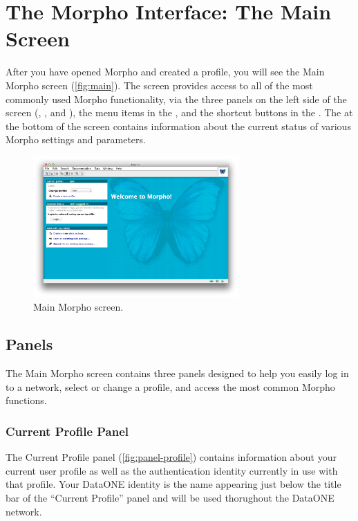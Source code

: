 \section{The Morpho Interface: The Main Screen} \label{sec:main}

After you have opened Morpho and created a profile, you will see the
Main Morpho screen (\autoref{fig:main}). The screen provides access to
all of the most commonly used Morpho functionality, via the three panels
on the left side of the screen (,
, and ), the
menu items in the , and the shortcut buttons in
the . The  at the bottom of
the screen contains information about the current status of various
Morpho settings and parameters.

\begin{figure}
  \centering
    \includegraphics[width=0.7\textwidth]{images/main.jpg}
  \caption{Main Morpho screen.}
  \label{fig:main}
\end{figure}

\subsection{Panels}

The Main Morpho screen contains three panels designed to help you easily
log in to a network, select or change a profile, and access the most
common Morpho functions.

\subsubsection[Current profile]{Current Profile Panel}
\label{sec:panel-profile}

The Current Profile panel (\autoref{fig:panel-profile}) contains
information about your current user profile as well as the authentication
identity currently in use with that profile. Your DataONE identity is the name
appearing just below the title bar of the ``Current
Profile'' panel and will be used thorughout the DataONE network. 

